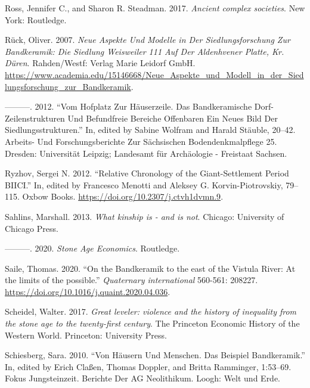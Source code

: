 \documentclass[
  12pt,
  a4paper, twoside]{book}
\newlength{\cslhangindent}
\newlength{\cslentryspacingunit} %
\newenvironment{CSLReferences}[2] %
 {%
  \setlength{\parindent}{0pt}
  \ifodd #1
  \let\oldpar\par
  \def\par{\hangindent=\cslhangindent\oldpar}
  \fi
  \setlength{\parskip}{#2\cslentryspacingunit}
 }%
 {}
\begin{document}
\begin{CSLReferences}{1}{0}
\leavevmode{}%
Ross, Jennifer C., and Sharon R. Steadman. 2017. \emph{Ancient complex societies}. New York: Routledge.

\leavevmode{}%
Rück, Oliver. 2007. \emph{Neue Aspekte Und Modelle in Der Siedlungsforschung Zur Bandkeramik: Die Siedlung Weisweiler 111 Auf Der Aldenhvener Platte, Kr. Düren}. Rahden/Westf: Verlag Marie Leidorf GmbH. \url{https://www.academia.edu/15146668/Neue_Aspekte_und_Modell_in_der_Siedlungsforschung_zur_Bandkeramik}.

\leavevmode{}%
---------. 2012. {``Vom Hofplatz Zur Häuserzeile. Das Bandkeramische Dorf-Zeilenstrukturen Und Befundfreie Bereiche Offenbaren Ein Neues Bild Der Siedlungsstrukturen.''} In, edited by Sabine Wolfram and Harald Stäuble, 20--42. Arbeits- Und Forschungsberichte Zur Sächsischen Bodendenkmalpflege 25. Dresden: Universität Leipzig; Landesamt für Archäologie - Freistaat Sachsen.

\leavevmode{}%
Ryzhov, Sergei N. 2012. {``Relative Chronology of the Giant-Settlement Period BII{\textendash}CI.''} In, edited by Francesco Menotti and Aleksey G. Korvin-Piotrovskiy, 79--115. Oxbow Books. \url{https://doi.org/10.2307/j.ctvh1dvmn.9}.

\leavevmode{}%
Sahlins, Marshall. 2013. \emph{What kinship is - and is not}. Chicago: University of Chicago Press.

\leavevmode{}%
---------. 2020. \emph{Stone Age Economics}. Routledge.

\leavevmode{}%
Saile, Thomas. 2020. {``On the Bandkeramik to the east of the Vistula River: At the limits of the possible.''} \emph{Quaternary international} 560-561: 208227. \url{https://doi.org/10.1016/j.quaint.2020.04.036}.

\leavevmode{}%
Scheidel, Walter. 2017. \emph{Great leveler: violence and the history of inequality from the stone age to the twenty-first century}. The Princeton Economic History of the Western World. Princeton: University Press.

\leavevmode{}%
Schiesberg, Sara. 2010. {``Von Häusern Und Menschen. Das Beispiel Bandkeramik.''} In, edited by Erich Claßen, Thomas Doppler, and Britta Ramminger, 1:53--69. Fokus Jungsteinzeit. Berichte Der AG Neolithikum. Loogh: Welt und Erde.


\end{CSLReferences}
\end{document}
